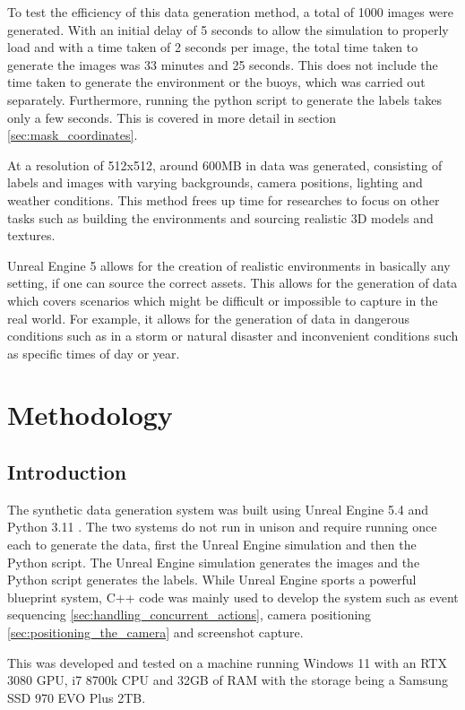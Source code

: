 \documentclass[10pt,twocolumn,letterpaper]{article}
\begin{document}
To test the efficiency of this data generation method, a total of 1000 images were generated. With an initial delay of 5 seconds to allow the simulation to properly load and with a time taken of 2 seconds per image, the total time taken to generate the images was 33 minutes and 25 seconds. This does not include the time taken to generate the environment or the buoys, which was carried out separately. Furthermore, running the python script to generate the labels takes only a few seconds. This is covered in more detail in section \ref{sec:mask_coordinates}.

At a resolution of 512x512, around 600MB in data was generated, consisting of labels and images with varying backgrounds, camera positions, lighting and weather conditions. This method frees up time for researches to focus on other tasks such as building the environments and sourcing realistic 3D models and textures. 

Unreal Engine 5 allows for the creation of realistic environments in basically any setting, if one can source the correct assets. This allows for the generation of data which covers scenarios which might be difficult or impossible to capture in the real world. For example, it allows for the generation of data in dangerous conditions such as in a storm or natural disaster and inconvenient conditions such as specific times of day or year.

\section{Methodology}

\subsection{Introduction}

The synthetic data generation system was built using Unreal Engine 5.4 \cite{EpicGames2024} and Python 3.11 \cite{PythonSoftwareFoundation2022}. The two systems do not run in unison and require running once each to generate the data, first the Unreal Engine simulation and then the Python script. The Unreal Engine simulation generates the images and the Python script generates the labels. While Unreal Engine sports a powerful blueprint system, C++ code was mainly used to develop the system such as event sequencing \ref{sec:handling_concurrent_actions}, camera positioning \ref{sec:positioning_the_camera} and screenshot capture.

This was developed and tested on a machine running Windows 11 with an RTX 3080 GPU, i7 8700k CPU and 32GB of RAM with the storage being a Samsung SSD 970 EVO Plus 2TB.
\end{document}
